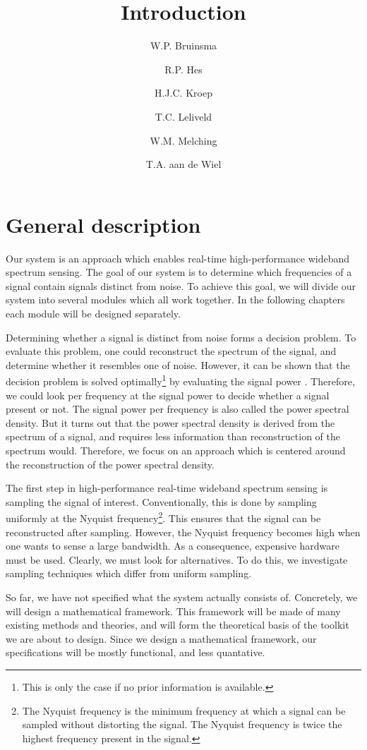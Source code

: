 \documentclass[a4paper, openany, oneside]{memoir}
\title{Introduction}
\author{W.P. Bruinsma \and R.P. Hes \and H.J.C. Kroep \and T.C. Leliveld \and W.M. Melching \and T.A. aan de Wiel}
\begin{document}
\section{General description}
Our system is an approach which enables real-time high-performance wideband spectrum sensing. The goal of our system is to determine which frequencies of a signal contain signals distinct from noise. To achieve this goal, we will divide our system into several modules which all work together. In the following chapters each module will be designed separately.

Determining whether a signal is distinct from noise forms a decision problem. To evaluate this problem, one could reconstruct the spectrum of the signal, and determine whether it resembles one of noise. However, it can be shown that the decision problem is solved optimally\footnote{This is only the case if no prior information is available.} by evaluating the signal power \cite{axell2012spectrum}. Therefore, we could look per frequency at the signal power to decide whether a signal present or not. The signal power per frequency is also called the power spectral density. But it turns out that the power spectral density is derived from the spectrum of a signal, and requires less information than reconstruction of the spectrum would. Therefore, we focus on an approach which is centered around the reconstruction of the power spectral density.

The first step in high-performance real-time wideband spectrum sensing is sampling the signal of interest. Conventionally, this is done by sampling uniformly at the Nyquist frequency\footnote{The Nyquist frequency is the minimum frequency at which a signal can be sampled without distorting the signal. The Nyquist frequency is twice the highest frequency present in the signal.}. This ensures that the signal can be reconstructed after sampling. However, the Nyquist frequency becomes high when one wants to sense a large bandwidth. As a consequence, expensive hardware must be used. Clearly, we must look for alternatives. To do this, we investigate sampling techniques which differ from uniform sampling.

So far, we have not specified what the system actually consists of. Concretely, we will design a mathematical framework. This framework will be made of many existing methods and theories, and will form the theoretical basis of the toolkit we are about to design. Since we design a mathematical framework, our specifications will be mostly functional, and less quantative. 
\end{document}
